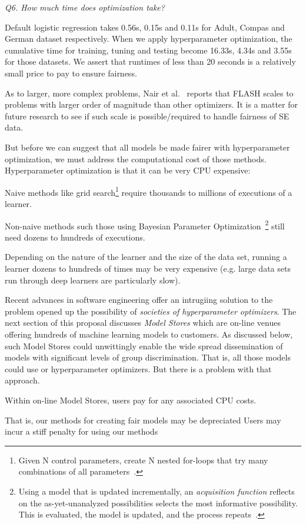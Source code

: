 {\em Q6. How much time does optimization take?}

Default logistic regression takes 0.56s, 0.15s and 0.11s for Adult, Compas and German dataset respectively. When we apply hyperparameter optimization, the cumulative time for training, tuning and testing become 16.33s, 4.34s and 3.55s for those datasets. 
We assert that  runtimes of less than 20 seconds is a relatively small price to pay to ensure fairness. 

As to larger, more complex problems, Nair et al.~\cite{8469102} reports
that FLASH scales to problems with larger order of magnitude than other optimizers. It is a matter for future research to see if such scale is possible/required to handle fairness of SE data. 



But before we can suggest that all models be made fairer with hyperparameter optimization, we must address the computational cost of those methods.
Hyperparameter optimization is that it can  be very CPU expensive:
\bi
\item
Naive methods like grid search\footnote{Given N control parameters, create N nested for-loops that try many combinations of all parameters~\cite{Bergstra:2012}.} require thousands to millions of executions of a learner. 
\item
Non-naive  methods such those using Bayesian Parameter Optimization~\footnote{Using a model that is updated incrementally, an {\em acquisition function}  reflects on the as-yet-unanalyzed possibilities selects the most informative possibility.
This is evaluated, the model is updated, and the process repeats~\cite{nair2017flash,zuluaga2016varepsilon,Golovin:2017}.}
still need dozens to hundreds of executions. 
\item
Depending  on the nature of the learner and the size of the data set,
running a learner  
dozens to hundreds of times may be very   expensive (e.g. large data sets run through deep learners are particularly slow). 
\ei

Recent advances in software engineering offer an intrugiing solution to the problem  opened up the possibility
of {\em societies of hyperparameter optimizers}. The next section of this proposal discusses {\em Model Stores} which are on-line venues offering hundreds of machine learning models to customers. As discussed below, such Model Stores could unwittingly enable the wide spread dissemination of models with significant levels of group discrimination. That is, all those models could use or hyperparameter optimizers. But there is a problem with that approach.
\bi
\item Within on-line Model Stores, users pay for any associated CPU costs. 
\item 
\item 
\item That is, our methods for creating fair models may be depreciated Users may incur a stiff penalty for using our methods
\ei


